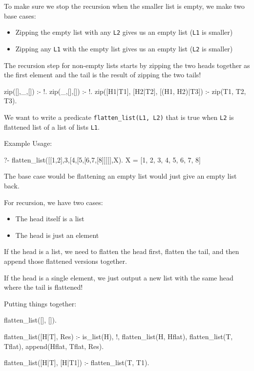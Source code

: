 
To make sure we stop the recursion when the smaller list is empty, we make two base cases:
\begin{itemize}
    \item Zipping the empty list with any \texttt{L2} gives us an empty list (\texttt{L1} is smaller)
    \item Zipping any \texttt{L1} with the empty list gives us an empty list (\texttt{L2} is smaller)
\end{itemize}

The recursion step for non-empty lists starts by zipping the two heads together as the first element and the tail is the result of zipping the two tails!

\begin{codeblock}
zip([],_,[]) :- !.
zip(_,[],[]) :- !.
zip([H1|T1], [H2|T2], [(H1, H2)|T3]) :-
    zip(T1, T2, T3).
\end{codeblock}



We want to write a predicate \texttt{flatten\_list(L1, L2)} that is true when \texttt{L2} is flattened list of a list of lists \texttt{L1}. 

Example Usage:
\begin{codeblock}
?- flatten_list([[1,2],3,[4,[5,[6,7,[8]]]]],X).
X = [1, 2, 3, 4, 5, 6, 7, 8]
\end{codeblock}

The base case would be flattening an empty list would just give an empty list back. 

For recursion, we have two cases:
\begin{itemize}
    \item The head itself is a list
    \item The head is just an element
\end{itemize}


If the head is a list, we need to flatten the head first, flatten the tail, and then append those flattened versions together. 

If the head is a single element, we just output a new list with the same head where the tail is flattened!

Putting things together:

\begin{codeblock}
flatten_list([], []).

flatten_list([H|T], Res) :-
    is_list(H), !,
    flatten_list(H, Hflat),
    flatten_list(T, Tflat),
    append(Hflat, Tflat, Res).

flatten_list([H|T], [H|T1]) :-
    flatten_list(T, T1).
\end{codeblock}

